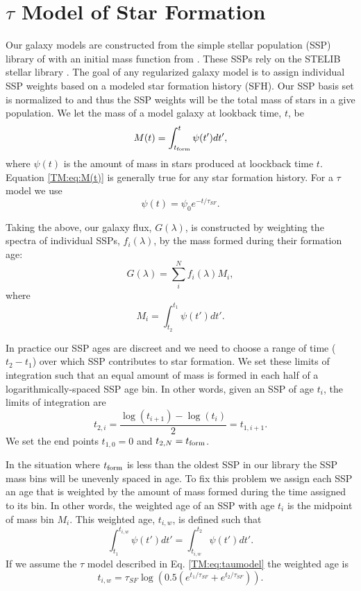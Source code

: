 \chapter{$\tau$ Model of Star Formation}
\label{chap:tau_model}
Our galaxy models are constructed from the simple stellar population
(SSP) library of \citet{Bruzual03} with an initial mass function from
\citet{Chabrier03}. These SSPs rely on the STELIB stellar library
\citep{LeBorgne03}. The goal of any regularized galaxy model is to
assign individual SSP weights based on a modeled star formation
history (SFH). Our SSP basis set is normalized to 
and thus the SSP weights will be the total mass of stars in a give
population. We let the mass of a model galaxy at lookback time, $t$,
be
\begin{equation}
\label{TM:eq:M(t)}
M(t) = \int_{t_{\rm form}}^t \psi(t') dt',
\end{equation}
where $\psi(t)$ is the amount of mass in stars produced at loockback time
$t$. Equation \ref{TM:eq:M(t)} is generally true for any star formation
history. For a $\tau$ model we use
\begin{equation}
\label{TM:eq:taumodel}
\psi(t) = \psi_0 e^{-t/\tau_{SF}}.
\end{equation}

Taking the above, our galaxy flux, $G(\lambda)$, is constructed by
weighting the spectra of individual SSPs, $f_i(\lambda)$, by the mass
formed during their formation age:
\begin{equation}
G(\lambda) = \sum_i^N f_i(\lambda) M_i,
\end{equation}
where
\begin{equation}
M_i = \int_{t_2}^{t_1} \psi(t') dt'.
\end{equation}

In practice our SSP ages are discreet and we need to choose a range of time
($t_2 - t_1$) over which SSP contributes to star formation. We set these
limits of integration such that an equal amount of mass is formed in each half
of a logarithmically-spaced SSP age bin. In other words, given an SSP of age
$t_i$, the limits of integration are
\begin{equation}
t_{2,i} = \frac{\log (t_{i+1}) - \log (t_i)}{2} = t_{1,i+1}.
\end{equation}
We set the end points $t_{1,0} = 0$ and $t_{2,N} = t_{\rm form}$.

In the situation where $t_{\rm form}$ is less than the oldest SSP in
our library the SSP mass bins will be unevenly spaced in age. To fix
this problem we assign each SSP an age that is weighted by the amount
of mass formed during the time assigned to its bin. In other words,
the weighted age of an SSP with age $t_i$ is the midpoint of mass bin
$M_i$. This weighted age, $t_{i,w}$, is defined such that
\begin{equation}
\int_{t_1}^{t_{i,w}} \psi(t') dt' = \int_{t_{i,w}}^{t_2} \psi(t') dt'.
\end{equation}
If we assume the $\tau$ model described in Eq. \ref{TM:eq:taumodel} the weighted age is
\begin{equation}
t_{i,w} = \tau_{SF} \log\left( 0.5 \left( e^{t_1/\tau_{SF}} + e^{t_2/\tau_{SF}} \right)\right).
\end{equation}

